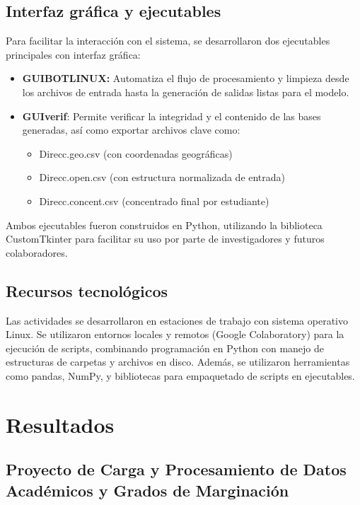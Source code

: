 \documentclass[10pt,a4paper]{report}
\begin{document}
\subsection{Interfaz gráfica y ejecutables}

Para facilitar la interacción con el sistema, se desarrollaron dos ejecutables principales con interfaz gráfica:

\begin{itemize}
\item \textbf{GUIBOTLINUX:} Automatiza el flujo de procesamiento y limpieza desde los archivos de entrada hasta la generación de salidas listas para el modelo.

\item \textbf{GUIverif}: Permite verificar la integridad y el contenido de las bases generadas, así como exportar archivos clave como:
\begin{itemize}
\item Direcc.geo.csv (con coordenadas geográficas)
\item Direcc.open.csv (con estructura normalizada de entrada)
\item Direcc.concent.csv (concentrado final por estudiante)
\end{itemize}
\end{itemize}

Ambos ejecutables fueron construidos en Python, utilizando la biblioteca CustomTkinter para facilitar su uso por parte de investigadores y futuros colaboradores.


\subsection{Recursos tecnológicos}

Las actividades se desarrollaron en estaciones de trabajo con sistema operativo Linux. Se utilizaron entornos locales y remotos (Google Colaboratory) para la ejecución de scripts, combinando programación en Python con manejo de estructuras de carpetas y archivos en disco. Además, se utilizaron herramientas como pandas, NumPy, y bibliotecas para empaquetado de scripts en ejecutables.

\section{Resultados}

\subsection{Proyecto de Carga y Procesamiento de Datos Académicos y Grados de Marginación}
\end{document}
